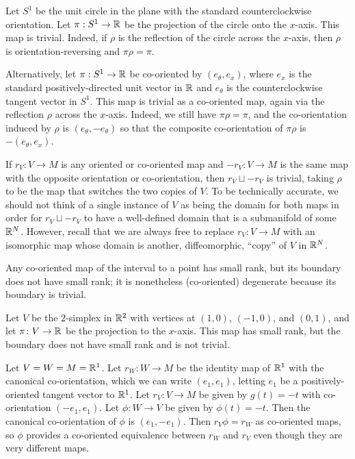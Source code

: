 \begin{example}
Let $S^1$ be the unit circle in the plane with the standard counterclockwise orientation. Let $\pi: S^1 \to \mathbb{R}$ be the projection of the circle onto the $x$-axis. This map is trivial. Indeed, if $\rho$ is the reflection of the circle across the $x$-axis, then $\rho$ is orientation-reversing and $\pi \rho = \pi$.

Alternatively, let $\pi:S^1 \to \mathbb{R}$ be co-oriented by $(e_\theta,e_x)$, where $e_x$ is the standard positively-directed unit vector in $\mathbb{R}$ and $e_\theta$ is the counterclockwise tangent vector in $S^1$. This map is trivial as a co-oriented map, again via the reflection $\rho$ across the $x$-axis. Indeed, we still have $\pi \rho = \pi$, and the co-orientation induced by $\rho$ is $(e_\theta,-e_\theta)$ so that the composite co-orientation of $\pi\rho$ is $-(e_\theta,e_x)$.
\end{example}

\begin{example}
If $r_V \colon V \to M$ is any oriented or co-oriented map and $-r_V \colon V \to M$ is the same map with the opposite orientation or co-orientation, then $r_V \sqcup -r_V$ is trivial, taking $\rho$ to be the map that switches the two copies of $V$. To be technically accurate, we should not think of a single instance of $V$ as being the domain for both maps in order for $r_V \sqcup -r_V$ to have a well-defined domain that is a submanifold of some $\mathbb{R}^N$. However, recall that we are always free to replace $r_V \colon V \to M$ with an isomorphic map whose domain is another, diffeomorphic, ``copy'' of $V$ in $\mathbb{R}^N$.
\end{example}



\begin{example}
Any co-oriented map of the interval to a point has small rank, but its boundary does not have small rank; it is nonetheless (co-oriented) degenerate because its boundary is trivial.
\end{example}

\begin{example}\label{E: projected triangle}
Let $V$ be the $2$-simplex in $\mathbb{R}^2$ with vertices at $(1,0)$, $(-1,0)$, and $(0,1)$, and let $\pi \colon V \to \mathbb{R}$ be the projection to the $x$-axis. This map has small rank, but the boundary does not have small rank and is not trivial.
\end{example}


\begin{example}
Let $V = W = M = \mathbb{R}^1$. Let $r_W \colon W \to M$ be the identity map of $\mathbb{R}^1$ with the canonical co-orientation, which we can write $(e_1,e_1)$, letting $e_1$ be a positively-oriented tangent vector to $\mathbb{R}^1$. Let $r_V \colon V \to M$ be given by $g(t) = -t$ with co-orientation $(-e_1,e_1)$. Let $\phi \colon W \to V$ be given by $\phi(t) = -t$. Then the canonical co-orientation of $\phi$ is $(e_1,-e_1)$. Then $r_V\phi = r_W$ as co-oriented maps, so $\phi$ provides a co-oriented equivalence between $r_W$ and $r_V$ even though they are very different maps.
\end{example}



